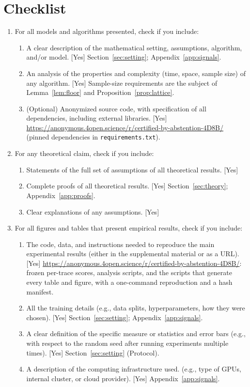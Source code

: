 \section*{Checklist}

\begin{enumerate}

  \item For all models and algorithms presented, check if you include:
  \begin{enumerate}
    \item A clear description of the mathematical setting, assumptions, algorithm, and/or model. [Yes] Section~\ref{sec:setting}; Appendix~\ref{app:signals}.
    \item An analysis of the properties and complexity (time, space, sample size) of any algorithm. [Yes] Sample-size requirements are the subject of Lemma~\ref{lem:floor} and Proposition~\ref{prop:lattice}.
    \item (Optional) Anonymized source code, with specification of all dependencies, including external libraries. [Yes] \url{https://anonymous.4open.science/r/certified-by-abstention-4D8B/} (pinned dependencies in \texttt{requirements.txt}).
  \end{enumerate}

  \item For any theoretical claim, check if you include:
  \begin{enumerate}
    \item Statements of the full set of assumptions of all theoretical results. [Yes]
    \item Complete proofs of all theoretical results. [Yes] Section~\ref{sec:theory}; Appendix~\ref{app:proofs}.
    \item Clear explanations of any assumptions. [Yes]
  \end{enumerate}

  \item For all figures and tables that present empirical results, check if you include:
  \begin{enumerate}
    \item The code, data, and instructions needed to reproduce the main experimental results (either in the supplemental material or as a URL). [Yes] \url{https://anonymous.4open.science/r/certified-by-abstention-4D8B/}: frozen per-trace scores, analysis scripts, and the scripts that generate every table and figure, with a one-command reproduction and a hash manifest.
    \item All the training details (e.g., data splits, hyperparameters, how they were chosen). [Yes] Section~\ref{sec:setting}; Appendix~\ref{app:signals}.
    \item A clear definition of the specific measure or statistics and error bars (e.g., with respect to the random seed after running experiments multiple times). [Yes] Section~\ref{sec:setting} (Protocol).
    \item A description of the computing infrastructure used. (e.g., type of GPUs, internal cluster, or cloud provider). [Yes] Appendix~\ref{app:signals}.
  \end{enumerate}


\end{enumerate}
